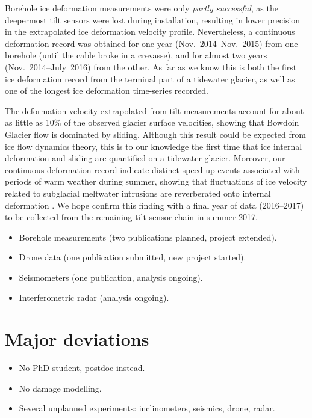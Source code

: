 \documentclass{article}
\begin{document}
Borehole ice deformation measurements were only \emph{partly successful}, as
the deepermost tilt sensors were lost during installation, resulting in lower
precision in the extrapolated ice deformation velocity profile. Nevertheless, a
continuous deformation record was obtained for one year (Nov.~2014--Nov.~2015)
from one borehole (until the cable broke in a crevasse), and for almost two
years (Nov.~2014--July~2016) from the other. As far as we know this is both the
first ice deformation record from the terminal part of a tidewater glacier, as
well as one of the longest ice deformation time-series recorded.

The deformation velocity extrapolated from tilt measurements account for about
as little as 10\% of the observed glacier surface velocities, showing that
Bowdoin Glacier flow is dominated by sliding. Although this result could be
expected from ice flow dynamics theory, this is to our knowledge the first time
that ice internal deformation and sliding are quantified on a tidewater
glacier. Moreover, our continuous deformation record indicate distinct speed-up
events associated with periods of warm weather during summer, showing that
fluctuations of ice velocity related to subglacial meltwater intrusions are
reverberated onto internal deformation \citep{Seguinot.etal.inprepb}. We hope
confirm this finding with a final year of data (2016--2017) to be collected
from the remaining tilt sensor chain in summer 2017.


\begin{itemize}
\item Borehole measurements (two publications planned, project extended).
\item Drone data (one publication submitted, new project started).
\item Seismometers (one publication, analysis ongoing).
\item Interferometric radar (analysis ongoing).
\end{itemize}

\section{Major deviations}

\begin{itemize}
\item No PhD-student, postdoc instead.
\item No damage modelling.
\item Several unplanned experiments: inclinometers, seismics, drone, radar.
\end{itemize}
\end{document}

